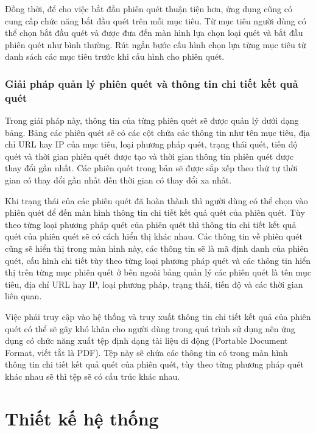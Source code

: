 Đồng thời, để cho việc bắt đầu phiên quét thuận tiện hơn, ứng dụng cũng có cung cấp chức năng bắt đầu quét trên mỗi mục tiêu.
Từ mục tiêu người dùng có thể chọn bắt đầu quét và được đưa đến màn hình lựa chọn loại quét và bắt đầu phiên quét như bình thường.
Rút ngắn bước cấu hình chọn lựa từng mục tiêu từ danh sách các mục tiêu trước khi cấu hình cho phiên quét.

\subsubsection{Giải pháp quản lý phiên quét và thông tin chi tiết kết quả quét}

\tab Trong giải pháp này, thông tin của từng phiên quét sẽ được quản lý dưới dạng bảng.
Bảng các phiên quét sẽ có các cột chứa các thông tin như tên mục tiêu, địa chỉ URL hay IP của mục tiêu, loại phương pháp quét, trạng thái quét, tiến độ quét và thời gian phiên quét được tạo và thời gian thông tin phiên quét được thay đổi gần nhất.
Các phiên quét trong bản sẽ được sắp xếp theo thứ tự thời gian có thay đổi gần nhất đến thời gian có thay đổi xa nhất.
\par

Khi trạng thái của các phiên quét đã hoàn thành thì người dùng có thể chọn vào phiên quét để đến màn hình thông tin chi tiết kết quả quét của phiên quét.
Tùy theo từng loại phương pháp quét của phiên quét thì thông tin chi tiết kết quả quét của phiên quét sẽ có cách hiển thị khác nhau.
Các thông tin về phiên quét cũng sẽ hiển thị trong màn hình này, các thông tin sẽ là mã định danh của phiên quét, cấu hình chi tiết tùy theo từng loại phương pháp quét và các thông tin hiển thị trên từng mục phiên quét ở bên ngoài bảng quản lý các phiên quét là tên mục tiêu, địa chỉ URL hay IP, loại phương pháp, trạng thái, tiến độ và các thời gian liên quan.
\par

Việc phải truy cập vào hệ thống và truy xuất thông tin chi tiết kết quả của phiên quét có thể sẽ gây khó khăn cho người dùng trong quá trình sử dụng nên ứng dụng có chức năng xuất tệp định dạng tài liệu di động (Portable Document Format, viết tắt là PDF).
Tệp này sẽ chứa các thông tin có trong màn hình thông tin chi tiết kết quả quét của phiên quét, tùy theo từng phương pháp quét khác nhau sẽ thì tệp sẽ có cấu trúc khác nhau.
\par

\section{Thiết kế hệ thống}

